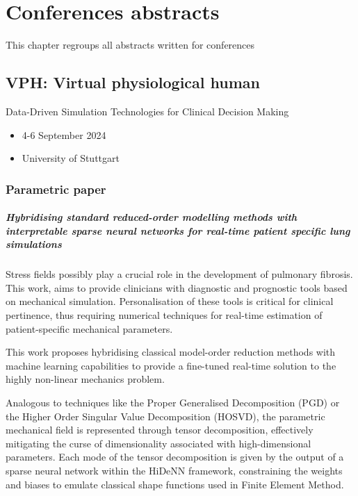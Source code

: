 \chapter[Conferences abstracts]{Conferences abstracts}
\label{chap:conf}
\begin{chapabstract}
    This chapter regroups all abstracts written for conferences
\end{chapabstract}

\minitoc

\section{VPH: Virtual physiological human}
Data-Driven Simulation Technologies for Clinical Decision Making
\begin{itemize}
    \item 4-6 September 2024
    \item University of Stuttgart
\end{itemize}

\subsection{Parametric paper}
\paragraph{Hybridising standard reduced-order modelling methods with interpretable sparse neural networks for real-time patient specific lung simulations}

Stress fields possibly play a crucial role in the development of pulmonary fibrosis. This work, aims to provide clinicians with diagnostic and prognostic tools based on mechanical simulation. Personalisation of these tools is critical for clinical pertinence, thus requiring numerical techniques for real-time estimation of patient-specific mechanical parameters.

This work proposes hybridising classical model-order reduction methods with machine learning capabilities to provide a fine-tuned real-time solution to the highly non-linear mechanics problem. 

Analogous to techniques like the Proper Generalised Decomposition (PGD) or the Higher Order Singular Value Decomposition (HOSVD), the parametric mechanical field is represented through tensor decomposition, effectively mitigating the curse of dimensionality associated with high-dimensional parameters. Each mode of the tensor decomposition is given by the output of a sparse neural network within the HiDeNN framework, constraining the weights and biases to emulate classical shape functions used in Finite Element Method.

